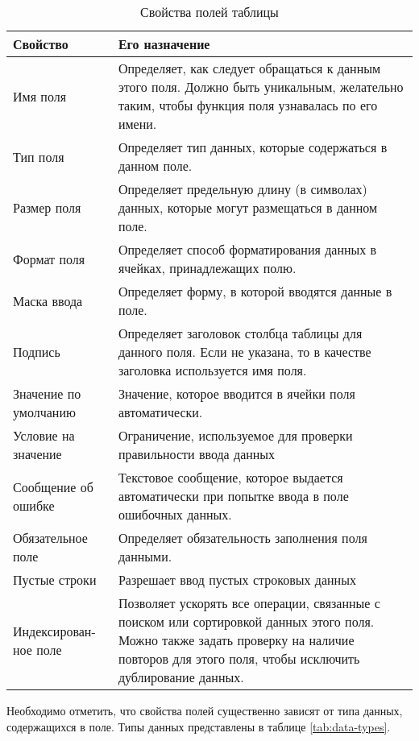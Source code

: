 \renewcommand{\arraystretch}{1.5}
\begin{xltabular}[h]{\textwidth}{|p{0.2 \textwidth}|X|}
    \caption{Свойства полей таблицы\label{tab:field-properties}} \\
    \hline
    \textbf{Свойство} & \textbf{Его назначение} \\
    \hline \endhead
    Имя поля & Определяет, как следует обращаться к данным этого поля. Должно быть уникальным, желательно таким, чтобы функция поля узнавалась по его имени. \\ \hline
    Тип поля & Определяет тип данных, которые содержаться в данном поле. \\ \hline
    Размер поля & Определяет предельную длину (в символах) данных, которые могут размещаться в данном поле. \\ \hline
    Формат поля & Определяет способ форматирования данных в ячейках, принадлежащих полю. \\ \hline
    Маска ввода & Определяет форму, в которой вводятся данные в поле. \\ \hline
    Подпись & Определяет заголовок столбца таблицы для данного поля. Если не указана, то в качестве заголовка используется имя поля. \\ \hline
    Значение по умолчанию & Значение, которое вводится в ячейки поля автоматически. \\ \hline
    Условие на значение & Ограничение, используемое для проверки правильности ввода данных \\ \hline
    Сообщение об ошибке & Текстовое сообщение, которое выдается автоматически при попытке ввода в поле ошибочных данных. \\ \hline
    Обязательное поле & Определяет обязательность заполнения поля данными. \\ \hline
    Пустые строки & Разрешает ввод пустых строковых данных \\ \hline
    Индексирован-ное поле & Позволяет ускорять все операции, связанные с поиском или сортировкой данных этого поля. Можно также задать проверку на наличие повторов для этого поля, чтобы исключить дублирование данных. \\ \hline
\end{xltabular}

Необходимо отметить, что свойства полей существенно зависят от типа данных, содержащихся в поле. Типы данных представлены в таблице \ref{tab:data-types}.

